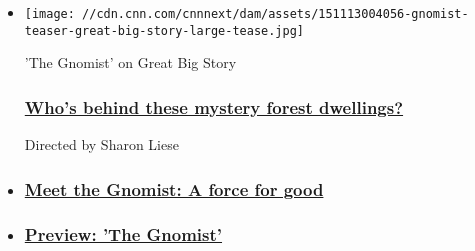 \begin{itemize}
\item
  \href{https://www.youtube.com/watch?v=ZLoBWpiOczQ}{}

  \texttt{[image: //cdn.cnn.com/cnnnext/dam/assets/151113004056-gnomist-teaser-great-big-story-large-tease.jpg]}

  'The Gnomist' on Great Big Story

  \hypertarget{whos-behind-these-mystery-forest-dwellings}{%
  \subsubsection{\texorpdfstring{\href{https://www.youtube.com/watch?v=ZLoBWpiOczQ}{Who's
  behind these mystery forest
  dwellings?}}{Who's behind these mystery forest dwellings?}}\label{whos-behind-these-mystery-forest-dwellings}}

  Directed by Sharon Liese
\item
  \hypertarget{meet-the-gnomist-a-force-for-good}{%
  \subsubsection{\texorpdfstring{\href{/2015/12/13/living/gnomist-film-kansas-utah/index.html}{Meet
  the Gnomist: A force for
  good}}{Meet the Gnomist: A force for good}}\label{meet-the-gnomist-a-force-for-good}}
\item
  \hypertarget{preview-the-gnomist}{%
  \subsubsection{\texorpdfstring{\href{/videos/us/2015/11/11/the-gnomist-preview-orig-ff.cnn}{Preview:
  'The Gnomist'}}{Preview: 'The Gnomist'}}\label{preview-the-gnomist}}
\end{itemize}

